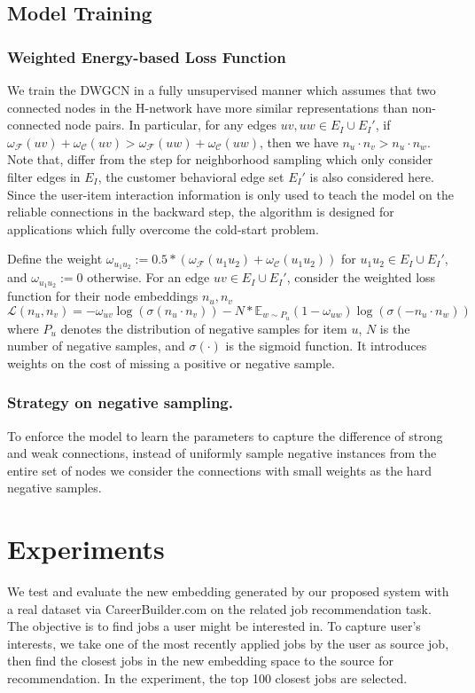 \documentclass[manuscript,screen,review]{acmart}
\newcommand\Fcal{\mathcal{F}}
\newcommand{\Ccal}{\mathcal{C}}
\begin{document}
\subsection{Model Training}
\subsubsection{Weighted Energy-based Loss Function} We train the DWGCN in a fully unsupervised manner which assumes that two connected nodes in the H-network have more similar representations than non-connected node pairs. In particular, for any edges $uv, uw\in E_I\cup E_I'$, if $\omega_{\Fcal}(uv)+\omega_{\Ccal}(uv)> \omega_{\Fcal}(uw)+\omega_{\Ccal}(uw)$, then we have $n_u\cdot n_v> n_u\cdot n_w$. Note that, differ from the step for neighborhood sampling which only consider filter edges in $E_I$, the customer behavioral edge set $E_I'$ is also considered here. Since the user-item interaction information is only used to teach the model on the reliable connections in the backward step, the algorithm is designed for applications which fully overcome the cold-start problem.

Define the weight $\omega_{u_1u_2}:=0.5*\left(\omega_{\Fcal}(u_1u_2)+\omega_{\Ccal}(u_1u_2)\right)$ for $u_1u_2\in E_I\cup E_I'$, and $\omega_{u_1u_2}:=0$ otherwise.
For an edge $uv\in E_I\cup E_I'$, consider the weighted loss function for their node embeddings $n_u,n_v$ 
\[\mathcal{L}(n_u,n_v)=-\omega_{uv}\log\left(\sigma(n_u\cdot n_v)\right)-N*\mathbb{E}_{w\sim P_u}(1-\omega_{uw})\log\left(\sigma(-n_u\cdot n_w)\right)\]
where $P_u$ denotes the distribution of negative samples for item $u$, $N$ is the number of negative samples, and $\sigma(\cdot)$ is the sigmoid function. It introduces weights on the cost of missing a positive or negative sample.


\subsubsection{Strategy on negative sampling.} 
To enforce the model to learn the parameters to capture the difference of strong and weak connections, instead of uniformly sample negative instances from the entire set of nodes we consider the connections with small weights as the hard negative samples. 
\vspace*{-2.5mm}
\section{Experiments} \label{Experiments}
We test and evaluate the new embedding generated by our proposed system with a real dataset via CareerBuilder.com
on the related job recommendation task. The objective is to find jobs a user might be interested in. To capture user's interests,
we take one of the most recently applied jobs by the user as source job, then find the closest jobs in the new embedding space to the source for recommendation. In the experiment, the top 100 closest jobs are selected.
\end{document}
